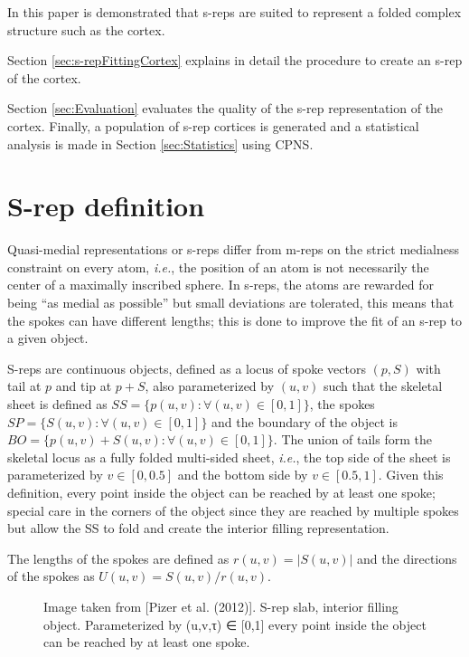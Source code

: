 \documentclass[a4paper,twoside]{article}
\begin{document}
In this paper is demonstrated that s-reps are suited to represent a folded complex structure such as the cortex. 

Section \ref{sec:s-repFittingCortex} explains in detail the procedure to create an s-rep of the cortex.

Section \ref{sec:Evaluation} evaluates the quality of the s-rep representation of the cortex.
Finally, a population of s-rep cortices is generated and a statistical analysis is made in Section \ref{sec:Statistics} using CPNS.

\section{S-rep definition}

Quasi-medial representations or s-reps \cite{pizer_nested_2012} differ from m-reps \cite{pizer2003deformable} on the strict medialness
constraint on every atom, \textit{i.e.}, the position of an atom is not necessarily the center 
of a maximally inscribed sphere. 
In s-reps, the atoms are rewarded for being ``as medial as possible'' but small 
deviations are tolerated, this means that the spokes can have different lengths;
this is done to improve the fit of an s-rep to a given object.

S-reps are continuous objects, defined as a locus of spoke vectors $(p, S)$ 
with tail at $p$ and tip at $p + S$, also parameterized by $(u, v)$ such that 
the skeletal sheet is defined as $SS = \{p(u, v) : \forall (u, v) \in [0, 1] \}$, the
spokes $SP = \{S(u, v) : \forall (u, v) \in [0, 1] \}$ and 
the boundary of the object is $BO = \{p(u, v) + S(u, v) : \forall (u, v) \in [0, 1] \}$.
The union of tails form the skeletal locus as a fully folded 
multi-sided sheet, \textit{i.e.}, the top side of the sheet is parameterized by $v \in [0, 0.5]$
and the bottom side by $v \in [0.5, 1]$.
Given this definition, every point inside the object can be reached by at least one spoke; 
special care in the corners of the object since they are reached by multiple spokes but allow the SS 
to fold and create the interior filling representation.

The lengths of the spokes are defined as $r(u, v) = |S(u, v)|$ and 
the directions of the spokes as $U(u, v) = S(u, v)/r(u, v)$. 

\begin{figure} 
 \centering  
 \caption[S-rep slab, interior filling object.]{Image taken from [Pizer et al. (2012)]. S-rep slab, interior filling object. Parameterized by (u,v,τ) ∈ [0,1] every point inside the object can be reached by at least one spoke.}
 \label{fig:srepFigure}
\end{figure}
\end{document}
